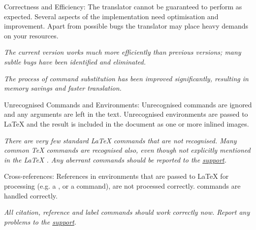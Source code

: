 \begin{htmllist}
\item [Correctness and Efficiency:\index{efficiency} ]
The translator cannot be guaranteed to perform as expected.
Several aspects of the implementation need
optimisation and improvement. Apart from possible bugs the translator
may place heavy demands on your resources.
\begin{changebar}
\textit
{The current version works much more efficiently than previous
versions; many subtle bugs have been identified and eliminated.}
\end{changebar}
\begin{changebar}
\textit
{The process of command substitution has been improved significantly,
resulting in memory savings and faster translation.}
\end{changebar}

\item [Unrecognised Commands and Environments:\index{unrecognised commands} ]
Unrecognised commands are ignored and any arguments are left in the text.
Unrecognised environments are passed to \LaTeX{}  and the result is
included in the document as one or more inlined images.
\begin{changebar}
\newline\textit
{There are very few standard \LaTeX{} commands that are not recognised.
Many common \TeX{} commands are recognised also,
even though not explicitly mentioned
in the \LaTeX{} .
Any aberrant commands should be reported to the \latextohtml{}
\hyperref{mailing list}{mailing list, see Section~}{}{support}.}
\end{changebar}


\item [Cross-references:\index{cross-references} ]
References in environments that are passed to \LaTeX{}  for processing
(e.g. a , or a  command),
are not processed correctly.
 commands are handled correctly.
\begin{changebar}
\newline\textit
{All citation, reference and label commands should work correctly now.
Report any problems to the \latextohtml{}
\hyperref{mailing list}{mailing list, see Section~}{}{support}.}
\end{changebar}


\end{htmllist}
